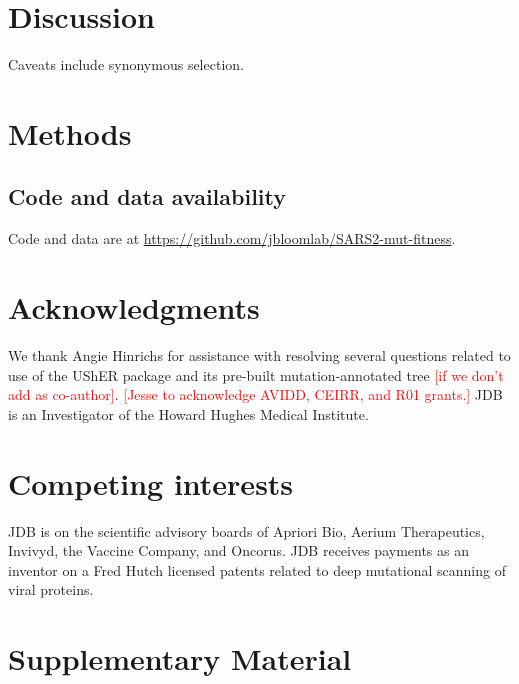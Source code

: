 \documentclass[9pt,twocolumn,twoside]{gsajnl_modified}
\newcommand\jdbcomment[1]{\textcolor{red}{[#1]}}
\begin{document}
\section{Discussion}

Caveats include synonymous selection.

{\small

\section{Methods}
\subsection{Code and data availability}
Code and data are at \url{https://github.com/jbloomlab/SARS2-mut-fitness}.

\section{Acknowledgments}
We thank Angie Hinrichs for assistance with resolving several questions related to use of the UShER package and its pre-built mutation-annotated tree \jdbcomment{if we don't add as co-author}.
\jdbcomment{Jesse to acknowledge AVIDD, CEIRR, and R01 grants.}
JDB is an Investigator of the Howard Hughes Medical Institute.

\section{Competing interests}
JDB is on the scientific advisory boards of Apriori Bio, Aerium Therapeutics, Invivyd, the Vaccine Company, and Oncorus.
JDB receives payments as an inventor on a Fred Hutch licensed patents related to deep mutational scanning of viral proteins.


}

\onecolumn
\renewcommand{\thepage}{S\arabic{page}}
\setcounter{page}{1}
\renewcommand{\thefigure}{S\arabic{figure}}
\setcounter{figure}{0}

\clearpage

\section{Supplementary Material}
\end{document}

